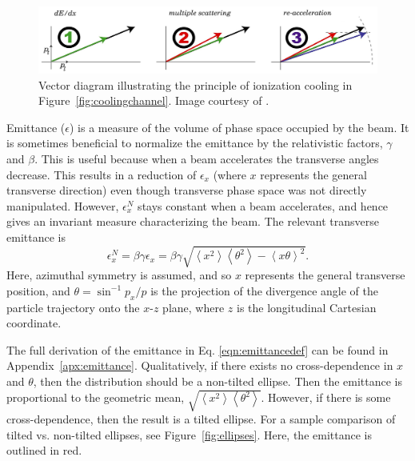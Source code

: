 \begin{figure}
  \centering
   \captionsetup{singlelinecheck=off}
    \includegraphics[width=\textwidth]{Figures/123ionization} 
  \caption{Vector diagram illustrating the principle of ionization cooling in Figure~\ref{fig:coolingchannel}. Image courtesy of \cite{MICE_repository}.}
  \label{fig:123ionization}
\end{figure}


\label{sec:emittance}\par
Emittance ($\epsilon$) is a measure of the volume of phase space occupied by the beam. It is sometimes beneficial to normalize the emittance by the relativistic factors, $\gamma$ and $\beta$. This is useful because when a beam accelerates the transverse angles decrease. This results in a  reduction of $\epsilon_x$ (where $x$ represents the general transverse direction) even though transverse phase space was not directly manipulated. However, $\epsilon_x ^N$ stays constant when a beam accelerates, and hence gives an invariant measure characterizing the beam. The relevant transverse emittance is
%
\begin{equation}
\label{eqn:emittancedef}
\epsilon_x^N=\beta\gamma\epsilon_x=\beta\gamma\sqrt{\left<x^2\right>\left<\theta^2\right>-\left<x\theta\right>^2}.
\end{equation}
%
Here, azimuthal symmetry is assumed, and so $x$ represents the general transverse position, and $\theta =\sin^{-1} p_x/p$ is the projection of the divergence angle of the particle trajectory onto the $x$-$z$ plane, where $z$ is the longitudinal Cartesian coordinate. 

The full derivation of the emittance in Eq. \eqref{eqn:emittancedef} can be found in Appendix~\ref{apx:emittance}. Qualitatively, if there exists no cross-dependence in $x$ and $\theta$, then the distribution should be a non-tilted ellipse. Then the emittance is proportional to the geometric mean, $\sqrt{\left<x^2\right>\left<\theta^2\right>}$. However, if there is some cross-dependence, then the result is a tilted ellipse. For a sample comparison of tilted vs. non-tilted ellipses, see Figure~\ref{fig:ellipses}. Here, the emittance is outlined in red.

